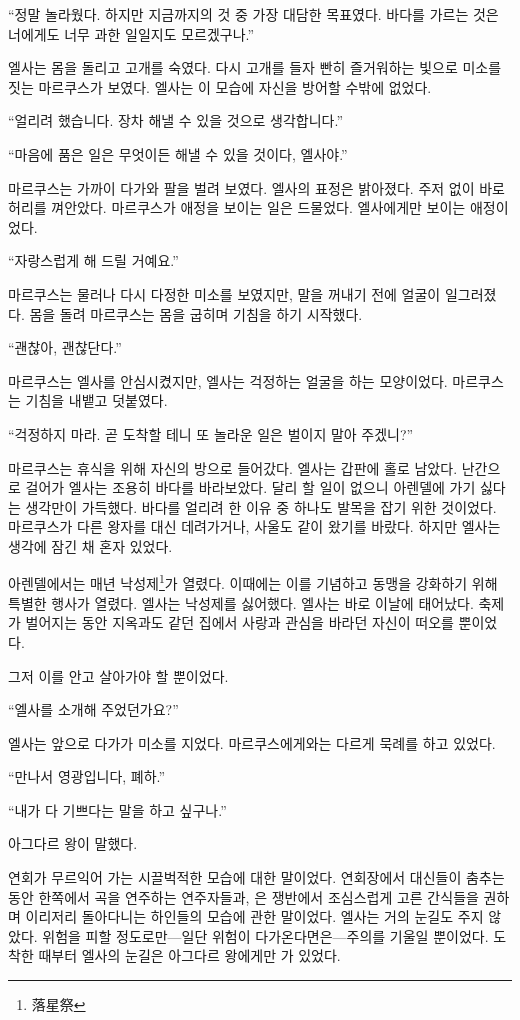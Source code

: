 ``정말 놀라웠다. 하지만 지금까지의 것 중 가장 대담한 목표였다. 바다를 가르는 것은 너에게도 너무 과한 일일지도 모르겠구나.''

엘사는 몸을 돌리고 고개를 숙였다. 다시 고개를 들자 빤히 즐거워하는 빛으로 미소를 짓는 마르쿠스가 보였다. 엘사는 이 모습에 자신을 방어할 수밖에 없었다.

``얼리려 했습니다. 장차 해낼 수 있을 것으로 생각합니다.''

``마음에 품은 일은 무엇이든 해낼 수 있을 것이다, 엘사야.''

마르쿠스는 가까이 다가와 팔을 벌려 보였다. 엘사의 표정은 밝아졌다. 주저 없이 바로 허리를 껴안았다. 마르쿠스가 애정을 보이는 일은 드물었다. 엘사에게만 보이는 애정이었다.

``자랑스럽게 해 드릴 거예요.''

마르쿠스는 물러나 다시 다정한 미소를 보였지만, 말을 꺼내기 전에 얼굴이 일그러졌다. 몸을 돌려 마르쿠스는 몸을 굽히며 기침을 하기 시작했다.

``괜찮아, 괜찮단다.''

마르쿠스는 엘사를 안심시켰지만, 엘사는 걱정하는 얼굴을 하는 모양이었다. 마르쿠스는 기침을 내뱉고 덧붙였다.

``걱정하지 마라. 곧 도착할 테니 또 놀라운 일은 벌이지 말아 주겠니?''

마르쿠스는 휴식을 위해 자신의 방으로 들어갔다. 엘사는 갑판에 홀로 남았다. 난간으로 걸어가 엘사는 조용히 바다를 바라보았다. 달리 할 일이 없으니 아렌델에 가기 싫다는 생각만이 가득했다. 바다를 얼리려 한 이유 중 하나도 발목을 잡기 위한 것이었다. 마르쿠스가 다른 왕자를 대신 데려가거나, 사울도 같이 왔기를 바랐다. 하지만 엘사는 생각에 잠긴 채 혼자 있었다.

아렌델에서는 매년 낙성제\footnote{落星祭}가 열렸다. 이때에는 이를 기념하고 동맹을 강화하기 위해 특별한 행사가 열렸다. 엘사는 낙성제를 싫어했다. 엘사는 바로 이날에 태어났다. 축제가 벌어지는 동안 지옥과도 같던 집에서 사랑과 관심을 바라던 자신이 떠오를 뿐이었다.

그저 이를 안고 살아가야 할 뿐이었다.

\textbreak

\forceindent``엘사를 소개해 주었던가요?''

엘사는 앞으로 다가가 미소를 지었다. 마르쿠스에게와는 다르게 묵례를 하고 있었다.

``만나서 영광입니다, 폐하.''

``내가 다 기쁘다는 말을 하고 싶구나.''

아그다르 왕이 말했다.

연회가 무르익어 가는 시끌벅적한 모습에 대한 말이었다. 연회장에서 대신들이 춤추는 동안 한쪽에서 곡을 연주하는 연주자들과, 은 쟁반에서 조심스럽게 고른 간식들을 권하며 이리저리 돌아다니는 하인들의 모습에 관한 말이었다. 엘사는 거의 눈길도 주지 않았다. 위험을 피할 정도로만—일단 위험이 다가온다면은—주의를 기울일 뿐이었다. 도착한 때부터 엘사의 눈길은 아그다르 왕에게만 가 있었다.


